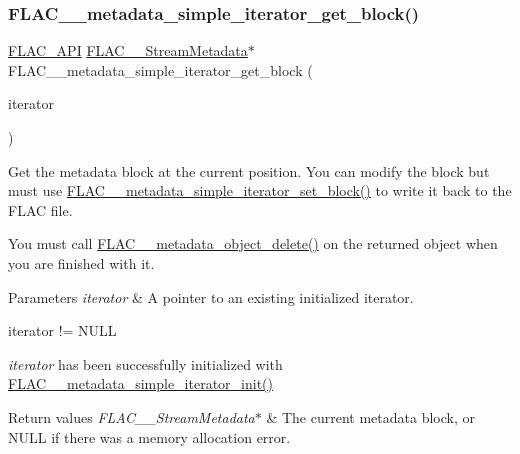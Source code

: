 \subsubsection{\texorpdfstring{F\+L\+A\+C\+\_\+\+\_\+metadata\+\_\+simple\+\_\+iterator\+\_\+get\+\_\+block()}{FLAC\_\_metadata\_simple\_iterator\_get\_block()}}
{\footnotesize\ttfamily \hyperlink{group__flac__export_ga56ca07df8a23310707732b1c0007d6f5}{F\+L\+A\+C\+\_\+\+A\+PI} \hyperlink{struct_f_l_a_c_____stream_metadata}{F\+L\+A\+C\+\_\+\+\_\+\+Stream\+Metadata}$\ast$ F\+L\+A\+C\+\_\+\+\_\+metadata\+\_\+simple\+\_\+iterator\+\_\+get\+\_\+block (\begin{DoxyParamCaption}\item[{\hyperlink{group__flac__metadata__level1_ga6accccddbb867dfc2eece9ee3ffecb3a}{F\+L\+A\+C\+\_\+\+\_\+\+Metadata\+\_\+\+Simple\+Iterator} $\ast$}]{iterator }\end{DoxyParamCaption})}

Get the metadata block at the current position. You can modify the block but must use \hyperlink{group__flac__metadata__level1_ga7d1ceb2db292c968ae6ac18ecb15c356}{F\+L\+A\+C\+\_\+\+\_\+metadata\+\_\+simple\+\_\+iterator\+\_\+set\+\_\+block()} to write it back to the F\+L\+AC file.

You must call \hyperlink{group__flac__metadata__object_ga66bbe27dba68ba77be5af83986a280ea}{F\+L\+A\+C\+\_\+\+\_\+metadata\+\_\+object\+\_\+delete()} on the returned object when you are finished with it.


\begin{DoxyParams}{Parameters}
{\em iterator} & A pointer to an existing initialized iterator.  
\begin{DoxyCode}
iterator != NULL 
\end{DoxyCode}
 {\itshape iterator} has been successfully initialized with \hyperlink{group__flac__metadata__level1_ga2a055cca4e6e06ae62517c8b0fa6e8a3}{F\+L\+A\+C\+\_\+\+\_\+metadata\+\_\+simple\+\_\+iterator\+\_\+init()} \\
\hline
\end{DoxyParams}

\begin{DoxyRetVals}{Return values}
{\em F\+L\+A\+C\+\_\+\+\_\+\+Stream\+Metadata$\ast$} & The current metadata block, or {\ttfamily N\+U\+LL} if there was a memory allocation error. \\
\hline
\end{DoxyRetVals}
\mbox{\label{group__flac__metadata__level1_gaad69b5d6c58c48e08dcfb3f1018c2602}} 
